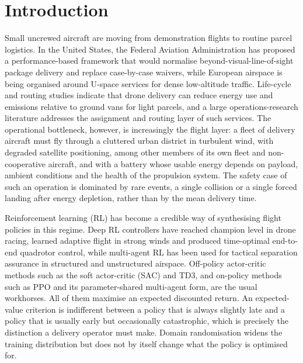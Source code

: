 \section*{Introduction}

Small uncrewed aircraft are moving from demonstration flights to routine parcel logistics. In the United States, the Federal Aviation Administration has proposed a performance-based framework that would normalise beyond-visual-line-of-sight package delivery and replace case-by-case waivers\cite{faa2025part108}, while European airspace is being organised around U-space services for dense low-altitude traffic\cite{sesar2023uspace,kopardekar2016utm}. Life-cycle and routing studies indicate that drone delivery can reduce energy use and emissions relative to ground vans for light parcels\cite{stolaroff2018energy,kirschstein2020comparison,chiang2019impact}, and a large operations-research literature addresses the assignment and routing layer of such services\cite{dorling2017vrp,macrina2020drone,cheng2020energy,bi2024truck}. The operational bottleneck, however, is increasingly the flight layer: a fleet of delivery aircraft must fly through a cluttered urban district in turbulent wind, with degraded satellite positioning, among other members of its own fleet and non-cooperative aircraft, and with a battery whose usable energy depends on payload, ambient conditions and the health of the propulsion system. The safety case of such an operation is dominated by rare events, a single collision or a single forced landing after energy depletion, rather than by the mean delivery time.

Reinforcement learning (RL) has become a credible way of synthesising flight policies in this regime. Deep RL controllers have reached champion level in drone racing\cite{kaufmann2023champion,song2023reaching}, learned adaptive flight in strong winds\cite{oconnell2022neuralfly,zhang2025extreme} and produced time-optimal end-to-end quadrotor control\cite{ferede2024endtoend}, while multi-agent RL has been used for tactical separation assurance in structured and unstructured airspace\cite{brittain2021jais,brittain2022scalable,chen2024uam,sharifi2026hetero}. Off-policy actor-critic methods such as the soft actor-critic (SAC)\cite{haarnoja2018sac} and TD3\cite{fujimoto2018td3}, and on-policy methods such as PPO\cite{schulman2017ppo,schulman2016gae} and its parameter-shared multi-agent form\cite{yu2022mappo}, are the usual workhorses. All of them maximise an expected discounted return. An expected-value criterion is indifferent between a policy that is always slightly late and a policy that is usually early but occasionally catastrophic, which is precisely the distinction a delivery operator must make. Domain randomisation\cite{tobin2017domain} widens the training distribution but does not by itself change what the policy is optimised for.

